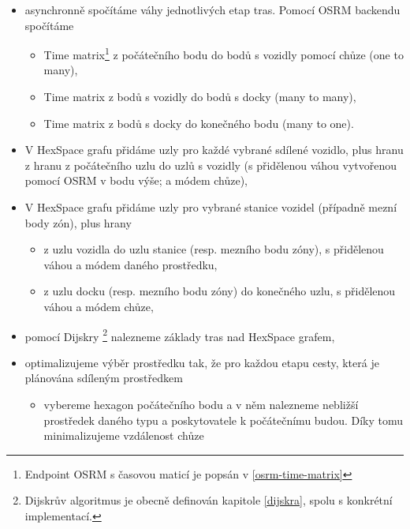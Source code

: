 \documentclass[thesis=M,czech]{FITthesis}[2019/12/23]
\theoremstyle{plain}
\theoremstyle{definition}
\begin{document}
\begin{enumerate}
\begin{itemize}
		\item asynchronně spočítáme váhy jednotlivých etap tras. Pomocí OSRM backendu spočítáme 
		\begin{itemize}
			\item Time matrix\footnote{Endpoint OSRM s časovou maticí je popsán v \ref{osrm-time-matrix}} z počátečního bodu do bodů s vozidly pomocí chůze (one to many),
			\item Time matrix z bodů s vozidly do bodů s docky (many to many),
			\item Time matrix z bodů s docky do konečného bodu (many to one).
		\end{itemize}
		
		\item V HexSpace grafu přidáme uzly pro každé vybrané sdílené vozidlo, plus hranu z hranu z počátečního uzlu do uzlů s vozidly (s přidělenou váhou vytvořenou pomocí OSRM v bodu výše; a módem chůze),
		\item V HexSpace grafu přidáme uzly pro vybrané stanice vozidel (případně mezní body zón), plus hrany 
		\begin{itemize}
			\item z uzlu vozidla do uzlu stanice (resp. mezního bodu zóny), s přidělenou váhou a módem daného prostředku,
			\item z uzlu docku (resp. mezního bodu zóny) do konečného uzlu, s přidělenou váhou a módem chůze,
		\end{itemize}

		\item pomocí Dijskry \footnote{Dijskrův algoritmus je obecně definován kapitole \ref{dijskra}, spolu s konkrétní implementací.} nalezneme základy tras nad HexSpace grafem,

		\item optimalizujeme výběr prostředku tak, že pro každou etapu cesty, která je plánována sdíleným prostředkem
		\begin{itemize}
			\item vybereme hexagon počátečního bodu a v něm nalezneme nebližší prostředek daného typu a poskytovatele k počátečnímu budou. Díky tomu minimalizujeme vzdálenost chůze
		\end{itemize}


\end{itemize}
\end{enumerate}
\end{document}
